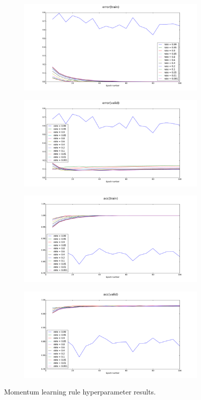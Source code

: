 \documentclass[12pt]{article}
\begin{document}
\begin{figure}[h]
\centering
\begin{subfigure}{.5\textwidth}
  \centering
  \includegraphics[width=9.1cm]{Task2/figures/Only_mome_error(train).pdf}
\end{subfigure}%
\begin{subfigure}{.5\textwidth}
  \centering
  \includegraphics[width=9.1cm]{Task2/figures/Only_mome_error(valid).pdf}
\end{subfigure}%
\end{figure}
\begin{figure}[h]
\centering
\begin{subfigure}{.5\textwidth}
  \centering
  \includegraphics[width=9.1cm]{Task2/figures/Only_mome_acc(train).pdf}
\end{subfigure}%
\begin{subfigure}{.5\textwidth}
  \centering
  \includegraphics[width=9.1cm]{Task2/figures/Only_mome_acc(valid).pdf}
\end{subfigure}%
  \caption{Momentum learning rule hyperparameter results.}
  \label{fig:only_mome}
\end{figure}
\end{document}
